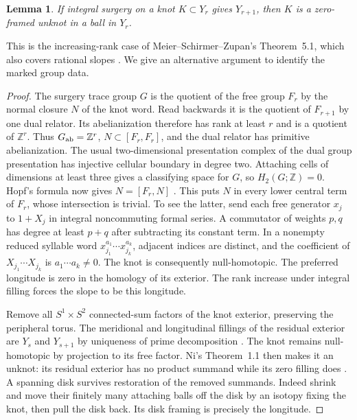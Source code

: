 \documentclass[11pt,letterpaper]{article}
\numberwithin{equation}{section}
\newtheorem{lemma}[theorem]{Lemma}
\theoremstyle{remark}
\begin{document}
\begin{lemma}\label{lem:last-knot}
If integral surgery on a knot \(K\subset Y_r\) gives \(Y_{r+1}\),
then \(K\) is a zero-framed unknot in a ball in \(Y_r\).
\end{lemma}
This is the increasing-rank case of Meier--Schirmer--Zupan's
Theorem~5.1, which also covers rational slopes
\cite{MeierSchirmerZupan2016Trisections}. We give an alternative
argument to identify the marked group data.
\begin{proof}
The surgery trace group \(G\) is the quotient of the free group
\(F_r\) by the normal closure \(N\) of the knot word. Read backwards
it is the quotient of \(F_{r+1}\) by one dual relator.
Its abelianization therefore has rank at least \(r\) and is a
quotient of \(\mathbb Z^r\). Thus \(G_{\rm ab}=\mathbb Z^r\),
\(N\subset[F_r,F_r]\), and the dual relator has primitive
abelianization. The usual two-dimensional presentation complex of the
dual group presentation has injective cellular boundary in degree two.
Attaching cells of dimensions at least three gives a classifying
space for \(G\), so \(H_2(G;\mathbb Z)=0\).
Hopf's formula now gives \(N=[F_r,N]\)
\cite{BrownEllis1988Hopf}. This puts \(N\) in every lower central term
of \(F_r\), whose intersection is trivial. To see the latter, send
each free generator \(x_j\) to \(1+X_j\) in integral noncommuting
formal series. A commutator of weights \(p,q\) has degree at least
\(p+q\) after subtracting its constant term. In a nonempty reduced
syllable word \(x_{j_1}^{a_1}\cdots x_{j_k}^{a_k}\), adjacent indices
are distinct, and the coefficient of \(X_{j_1}\cdots X_{j_k}\) is
\(a_1\cdots a_k\ne0\). The knot is consequently null-homotopic.
The preferred longitude is zero in the homology of its exterior.
The rank increase under integral filling forces the slope to be
this longitude.

Remove all \(S^1\times S^2\) connected-sum factors of the knot
exterior, preserving the peripheral torus. The meridional and
longitudinal fillings of the residual exterior are \(Y_s\) and
\(Y_{s+1}\) by uniqueness of prime decomposition \cite[Theorem 1]{Milnor1962Prime}. The knot remains
null-homotopic by projection to its free factor. Ni's Theorem~1.1
then makes it an unknot: its residual exterior has no product
summand while its zero filling does \cite{Ni2023Null}.
A spanning disk survives restoration of the removed summands. Indeed
shrink and move their finitely many attaching balls off the disk
by an isotopy fixing the knot, then pull the disk back. Its disk
framing is precisely the longitude.
\end{proof}
\end{document}
